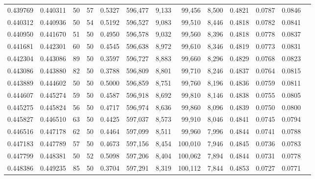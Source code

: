 \begin{tabular}{rrrrrrrrrrrrr}
0.439769 & 0.440311 &    50 &  57 &                                     0.5327 & 596,477 &   9,133 &  99,456 &   8,500 & 0.4821 & 0.0787 & 0.0846 \\
0.440312 & 0.440936 &    50 &  54 &                                     0.5192 & 596,527 &   9,083 &  99,510 &   8,446 & 0.4818 & 0.0782 & 0.0841 \\
0.440950 & 0.441670 &    51 &  50 &                                     0.4950 & 596,578 &   9,032 &  99,560 &   8,396 & 0.4818 & 0.0778 & 0.0837 \\
0.441681 & 0.442301 &    60 &  50 &                                     0.4545 & 596,638 &   8,972 &  99,610 &   8,346 & 0.4819 & 0.0773 & 0.0831 \\
0.442304 & 0.443086 &    89 &  50 &                                     0.3597 & 596,727 &   8,883 &  99,660 &   8,296 & 0.4829 & 0.0768 & 0.0823 \\
0.443086 & 0.443880 &    82 &  50 &                                     0.3788 & 596,809 &   8,801 &  99,710 &   8,246 & 0.4837 & 0.0764 & 0.0815 \\
0.443889 & 0.444602 &    50 &  50 &                                     0.5000 & 596,859 &   8,751 &  99,760 &   8,196 & 0.4836 & 0.0759 & 0.0811 \\
0.444607 & 0.445274 &    59 &  50 &                                     0.4587 & 596,918 &   8,692 &  99,810 &   8,146 & 0.4838 & 0.0755 & 0.0805 \\
0.445275 & 0.445824 &    56 &  50 &                                     0.4717 & 596,974 &   8,636 &  99,860 &   8,096 & 0.4839 & 0.0750 & 0.0800 \\
0.445827 & 0.446510 &    63 &  50 &                                     0.4425 & 597,037 &   8,573 &  99,910 &   8,046 & 0.4841 & 0.0745 & 0.0794 \\
0.446516 & 0.447178 &    62 &  50 &                                     0.4464 & 597,099 &   8,511 &  99,960 &   7,996 & 0.4844 & 0.0741 & 0.0788 \\
0.447183 & 0.447789 &    57 &  50 &                                     0.4673 & 597,156 &   8,454 & 100,010 &   7,946 & 0.4845 & 0.0736 & 0.0783 \\
0.447799 & 0.448381 &    50 &  52 &                                     0.5098 & 597,206 &   8,404 & 100,062 &   7,894 & 0.4844 & 0.0731 & 0.0778 \\
0.448386 & 0.449235 &    85 &  50 &                                     0.3704 & 597,291 &   8,319 & 100,112 &   7,844 & 0.4853 & 0.0727 & 0.0771 \\

\end{tabular}
